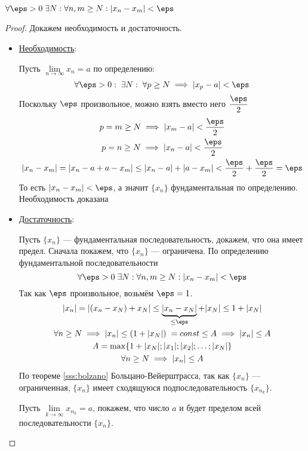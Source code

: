 \documentclass[12pt, a4paper]{article}
\begin{document}
	$\forall \eps > 0 \; \exists N: \forall n, m \geq N: |x_n - x_m| < \eps$
	\begin{proof}
		Докажем необходимость и достаточность.
		\begin{itemize}
			\item
			\underline{Необходимость}:

			Пусть $\lim\limits_{n \to \infty} x_n = a$ по определению:
			\begin{equation*}
				\forall \eps > 0: \; \exists N: \; \forall p \geq N \implies |x_p - a| < \eps
			\end{equation*}
			Поскольку $\eps$ произвольное, можно взять вместо него $\dfrac{\eps}{2}$
			\[\begin{gathered}
				p = m \geq N \implies |x_m - a| < \frac{\eps}{2} \\
				p = n \geq N \implies |x_n - a| < \frac{\eps}{2} \\
				|x_n - x_m| = |x_n - a + a - x_m| \leq |x_n - a| + |a - x_m| < \frac{\eps}{2} + \frac{\eps}{2} = \eps
			\end{gathered}\]
			То есть $|x_n - x_m| < \eps$, а значит $\{x_n\}$ фундаментальная по определению. Необходимость доказана

			\item
			\underline{Достаточность}:

			Пусть $\{x_n\}$ --- фундаментальная последовательность, докажем, что она имеет предел. Сначала покажем, что $\{x_n\}$ --- ограничена. По определению фундаментальной последовательности
			\begin{equation*}
				\forall \eps > 0 \; \exists N: \forall n, m \geq N: |x_n - x_m| < \eps
			\end{equation*}
			Так как $\eps$ произвольное, возьмём $\eps = 1$. 
			\[\begin{gathered}
				|x_n| = |(x_n - x_N) + x_N| \leq \underbrace{|x_n - x_N|}_{\leq \eps} + |x_N| \leq 1 + |x_N| \\
				\forall n \geq N \implies |x_n| \leq (1 + |x_N|) \; = const \leq A \implies |x_n| \leq A \\
				A = \max\{1 + |x_N|; |x_1|; |x_2|; \dots; |x_N|\} \\
				\forall n \geq N \implies |x_n| \leq A
			\end{gathered}\]
			По теореме \ref{sss:bolzano} Больцано-Вейерштрасса, так как $\{x_n\}$ --- ограниченная, $\{x_n\}$ имеет сходящуюся подпоследовательность $\{x_{n_k}\}$.

			Пусть $\lim\limits_{k \to \infty} x_{n_k} = a$, покажем, что число $a$ и будет пределом всей последовательности $\{x_n\}$.


\end{itemize}
\end{proof}
\end{document}
